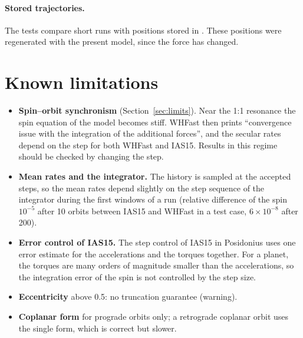 \paragraph{Stored trajectories.} The tests  compare short runs with positions stored in . These positions were regenerated with the present model, since the force has changed.

\section{Known limitations}\label{sec:pos-limits}
\begin{itemize}
  \item \textbf{Spin--orbit synchronism} (Section~\ref{sec:limits}). Near the 1:1 resonance the spin equation of the model becomes stiff. WHFast then prints ``convergence issue with the integration of the additional forces'', and the secular rates depend on the step for both WHFast and IAS15. Results in this regime should be checked by changing the step.
  \item \textbf{Mean rates and the integrator.} The history is sampled at the accepted steps, so the mean rates depend slightly on the step sequence of the integrator during the first windows of a run (relative difference of the spin $10^{-5}$ after 10 orbits between IAS15 and WHFast in a test case, $6\times10^{-8}$ after 200).
  \item \textbf{Error control of IAS15.} The step control of IAS15 in Posidonius uses one error estimate for the accelerations and the torques together. For a planet, the torques are many orders of magnitude smaller than the accelerations, so the integration error of the spin is not controlled by the step size.
  \item \textbf{Eccentricity} above 0.5: no truncation guarantee (warning).
  \item \textbf{Coplanar form} for prograde orbits only; a retrograde coplanar orbit uses the single form, which is correct but slower.
\end{itemize}
